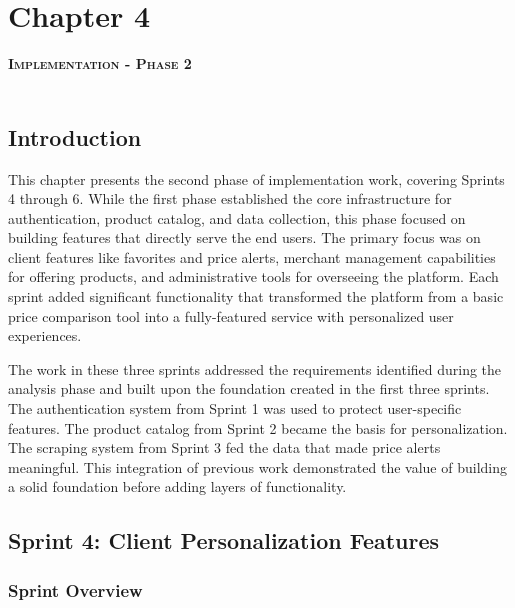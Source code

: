 \chapter*{Chapter 4}

\textsc{\textbf{\Huge Implementation - Phase 2}} \\ \\


\section*{Introduction}

This chapter presents the second phase of implementation work,
covering Sprints 4 through 6. While the first phase established
the core infrastructure for authentication, product catalog, and
data collection, this phase focused on building features that
directly serve the end users. The primary focus was on client
features like favorites and price alerts, merchant management
capabilities for offering products, and administrative tools
for overseeing the platform. Each sprint added significant
functionality that transformed the platform from a basic price
comparison tool into a fully-featured service with personalized
user experiences.

The work in these three sprints addressed the requirements
identified during the analysis phase and built upon the foundation
created in the first three sprints. The authentication system
from Sprint 1 was used to protect user-specific features. The
product catalog from Sprint 2 became the basis for personalization.
The scraping system from Sprint 3 fed the data that made price
alerts meaningful. This integration of previous work demonstrated
the value of building a solid foundation before adding layers
of functionality.

\section*{Sprint 4: Client Personalization Features}

\subsection*{Sprint Overview}

